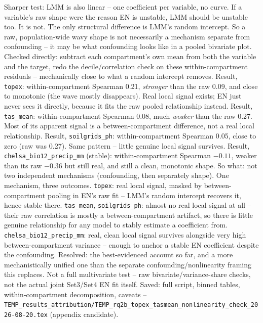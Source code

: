 \documentclass[logo,msc,ai]{infthesis}           %
\begin{document}
Sharper test: LMM is also linear -- one coefficient per variable, no curve. If a
variable's raw shape were the reason EN is unstable, LMM should be unstable too. It
is not. The only structural difference is LMM's random intercept. So a raw,
population-wide wavy shape is not necessarily a mechanism separate from
confounding -- it may be what confounding looks like in a pooled bivariate plot.
Checked directly: subtract each compartment's own mean from both the variable and
the target, redo the decile/correlation check on these within-compartment
residuals -- mechanically close to what a random intercept removes.
Result, \texttt{topex}: within-compartment Spearman 0.21, \emph{stronger} than the
raw 0.09, and close to monotonic (the wave mostly disappears). Real local signal
exists; EN just never sees it directly, because it fits the raw pooled relationship
instead.
Result, \texttt{tas\_mean}: within-compartment Spearman 0.08, much \emph{weaker}
than the raw 0.27. Most of its apparent signal is a between-compartment difference,
not a real local relationship.
Result, \texttt{soilgrids\_ph}: within-compartment Spearman 0.05, close to zero
(raw was 0.27). Same pattern -- little genuine local signal survives.
Result, \texttt{chelsa\_bio12\_precip\_mm} (stable): within-compartment Spearman
$-0.11$, weaker than its raw $-0.36$ but still real, and still a clean, monotonic
shape.
So what: not two independent mechanisms (confounding, then separately shape). One
mechanism, three outcomes. \texttt{topex}: real local signal, masked by
between-compartment pooling in EN's raw fit -- LMM's random intercept recovers it,
hence stable there. \texttt{tas\_mean}, \texttt{soilgrids\_ph}: almost no real
local signal at all -- their raw correlation is mostly a between-compartment
artifact, so there is little genuine relationship for any model to stably estimate
a coefficient from. \texttt{chelsa\_bio12\_precip\_mm}: real, clean local signal
survives alongside very high between-compartment variance -- enough to anchor a
stable EN coefficient despite the confounding.
Resolved: the best-evidenced account so far, and a more mechanistically unified one
than the separate confounding/nonlinearity framing this replaces. Not a full
multivariate test -- raw bivariate/variance-share checks, not the actual joint
Set3/Set4 EN fit itself.
Saved: full script, binned tables, within-compartment decomposition, caveats --
\texttt{TEMP\_results\_attribution/TEMP\_rq2b\_topex\_tasmean\_nonlinearity\_check\_2026-08-20.tex}
(appendix candidate).
\end{document}
